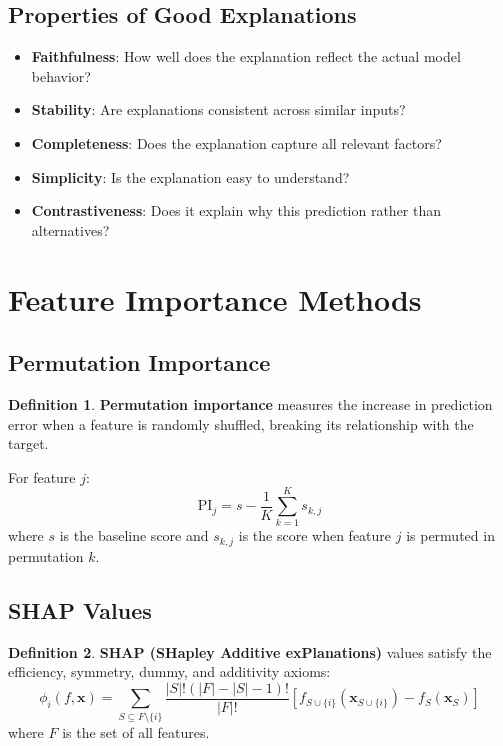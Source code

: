 \documentclass[11pt]{article}
\theoremstyle{definition}
\newtheorem{definition}{Definition}[section]
\begin{document}
\subsection{Properties of Good Explanations}
\begin{itemize}
    \item \textbf{Faithfulness}: How well does the explanation reflect the actual model behavior?
    \item \textbf{Stability}: Are explanations consistent across similar inputs?
    \item \textbf{Completeness}: Does the explanation capture all relevant factors?
    \item \textbf{Simplicity}: Is the explanation easy to understand?
    \item \textbf{Contrastiveness}: Does it explain why this prediction rather than alternatives?
\end{itemize}

\section{Feature Importance Methods}

\subsection{Permutation Importance}
\begin{definition}
\textbf{Permutation importance} measures the increase in prediction error when a feature is randomly shuffled, breaking its relationship with the target.
\end{definition}

For feature $j$:
$$\text{PI}_j = s - \frac{1}{K}\sum_{k=1}^K s_{k,j}$$
where $s$ is the baseline score and $s_{k,j}$ is the score when feature $j$ is permuted in permutation $k$.

\subsection{SHAP Values}
\begin{definition}
\textbf{SHAP (SHapley Additive exPlanations)} values satisfy the efficiency, symmetry, dummy, and additivity axioms:
$$\phi_i(f, \mathbf{x}) = \sum_{S \subseteq F \setminus \{i\}} \frac{|S|!(|F|-|S|-1)!}{|F|!}[f_{S \cup \{i\}}(\mathbf{x}_{S \cup \{i\}}) - f_S(\mathbf{x}_S)]$$
where $F$ is the set of all features.
\end{definition}
\end{document}
